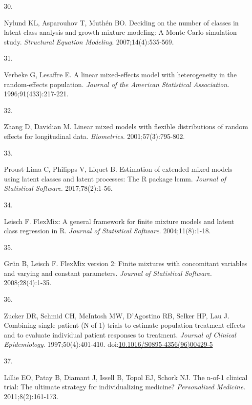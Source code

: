 \documentclass[
  11pt,
]{article}
\newlength{\cslhangindent}
\newlength{\csllabelwidth}
\newenvironment{CSLReferences}[2] %
 {\begin{list}{}{%
  \setlength{\itemindent}{0pt}
  \setlength{\leftmargin}{0pt}
  \setlength{\parsep}{0pt}
  \ifodd #1
   \setlength{\leftmargin}{\cslhangindent}
   \setlength{\itemindent}{-1\cslhangindent}
  \fi
  \setlength{\itemsep}{#2\baselineskip}}}
 {\end{list}}
\newcommand{\CSLLeftMargin}[1]{\parbox[t]{\csllabelwidth}{\strut#1\strut}}
\newcommand{\CSLRightInline}[1]{\parbox[t]{\linewidth - \csllabelwidth}{\strut#1\strut}}
\begin{document}
\begin{CSLReferences}{0}{1}
\CSLLeftMargin{30. }%
\CSLRightInline{Nylund KL, Asparouhov T, Muthén BO. Deciding on the number of classes in latent class analysis and growth mixture modeling: A {M}onte {C}arlo simulation study. \emph{Structural Equation Modeling}. 2007;14(4):535-569.}

\CSLLeftMargin{31. }%
\CSLRightInline{Verbeke G, Lesaffre E. A linear mixed-effects model with heterogeneity in the random-effects population. \emph{Journal of the American Statistical Association}. 1996;91(433):217-221.}

\CSLLeftMargin{32. }%
\CSLRightInline{Zhang D, Davidian M. Linear mixed models with flexible distributions of random effects for longitudinal data. \emph{Biometrics}. 2001;57(3):795-802.}

\CSLLeftMargin{33. }%
\CSLRightInline{Proust-Lima C, Philipps V, Liquet B. Estimation of extended mixed models using latent classes and latent processes: The {R} package lcmm. \emph{Journal of Statistical Software}. 2017;78(2):1-56.}

\CSLLeftMargin{34. }%
\CSLRightInline{Leisch F. {F}lex{M}ix: A general framework for finite mixture models and latent class regression in {R}. \emph{Journal of Statistical Software}. 2004;11(8):1-18.}

\CSLLeftMargin{35. }%
\CSLRightInline{Grün B, Leisch F. {F}lex{M}ix version 2: Finite mixtures with concomitant variables and varying and constant parameters. \emph{Journal of Statistical Software}. 2008;28(4):1-35.}

\CSLLeftMargin{36. }%
\CSLRightInline{Zucker DR, Schmid CH, McIntosh MW, D'Agostino RB, Selker HP, Lau J. Combining single patient ({N}-of-1) trials to estimate population treatment effects and to evaluate individual patient responses to treatment. \emph{Journal of Clinical Epidemiology}. 1997;50(4):401-410. doi:\href{https://doi.org/10.1016/S0895-4356(96)00429-5}{10.1016/S0895-4356(96)00429-5}}

\CSLLeftMargin{37. }%
\CSLRightInline{Lillie EO, Patay B, Diamant J, Issell B, Topol EJ, Schork NJ. The n-of-1 clinical trial: The ultimate strategy for individualizing medicine? \emph{Personalized Medicine}. 2011;8(2):161-173.}


\end{CSLReferences}
\end{document}
